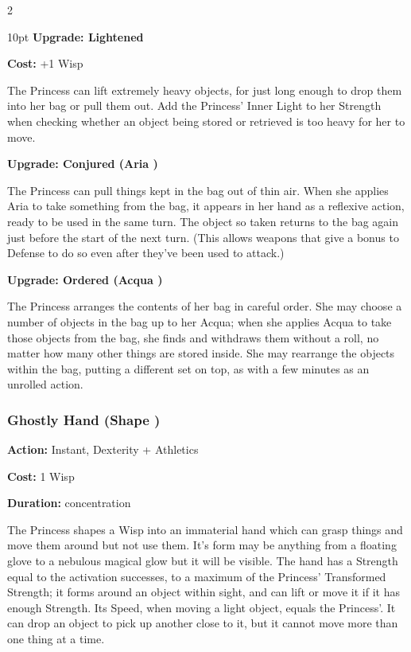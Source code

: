 \begin{multicols}{2}
\begin{myindentpar}{10pt}
\textbf{Upgrade: Lightened}

\noindent \textbf{Cost:} +1 Wisp

The Princess can lift extremely heavy objects, for just long enough to drop them into her bag or pull them out. Add the Princess' Inner Light to her Strength when checking whether an object being stored or retrieved is too heavy for her to move.

\textbf{Upgrade: Conjured (Aria \textbullet\textbullet)}

The Princess can pull things kept in the bag out of thin air. When she applies Aria to take something from the bag, it appears in her hand as a reflexive action, ready to be used in the same turn. The object so taken returns to the bag again just before the start of the next turn. (This allows weapons that give a bonus to Defense to do so even after they've been used to attack.)

\textbf{Upgrade: Ordered (Acqua \textbullet\textbullet)}

The Princess arranges the contents of her bag in careful order. She may choose a number of objects in the bag up to her Acqua; when she applies Acqua to take those objects from the bag, she finds and withdraws them without a roll, no matter how many other things are stored inside. She may rearrange the objects within the bag, putting a different set on top, as with a few minutes as an unrolled action.\end{myindentpar}

\subsubsection*{Ghostly Hand (Shape \textbullet\textbullet)}

\noindent \textbf{Action:} Instant, Dexterity + Athletics

\noindent \textbf{Cost:} 1 Wisp

\noindent \textbf{Duration:} concentration

The Princess shapes a Wisp into an immaterial hand which can grasp things and move them around but not use them. It's form may be anything from a floating glove to a nebulous magical glow but it will be visible. The hand has a Strength equal to the activation successes, to a maximum of the Princess' Transformed Strength; it forms around an object within sight, and can lift or move it if it has enough Strength. Its Speed, when moving a light object, equals the Princess'. It can drop an object to pick up another close to it, but it cannot move more than one thing at a time.


\end{multicols}
